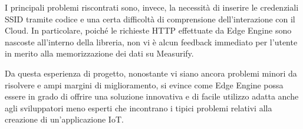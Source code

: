 I principali problemi riscontrati sono, invece, la necessità di inserire le credenziali SSID tramite codice e una certa difficoltà di comprensione dell'interazione con il Cloud. In particolare, poiché le richieste HTTP effettuate da Edge Engine sono nascoste all'interno della libreria, non vi è alcun feedback immediato per l'utente in merito alla memorizzazione dei dati su Measurify.

Da questa esperienza di progetto, nonostante vi siano ancora problemi minori da risolvere e ampi margini di miglioramento, si evince come Edge Engine possa essere in grado di offrire una soluzione innovativa e di facile utilizzo adatta anche agli sviluppatori meno esperti che incontrano i tipici problemi relativi alla creazione di un'applicazione IoT.




